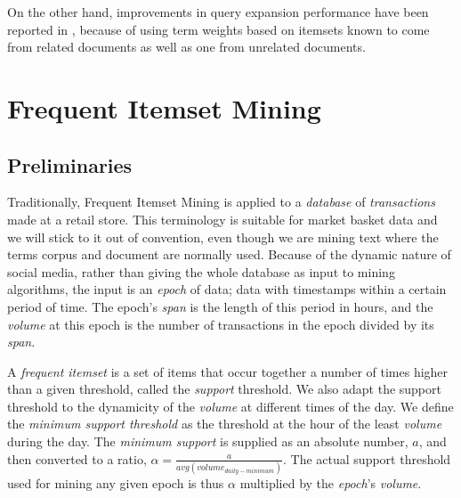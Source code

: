 \documentclass{sig-alternate}
\begin{document}
On the other hand, improvements in query expansion performance have been reported in \cite{li2010mining}, because of using  term weights based on itemsets known to come from related documents as well as one from unrelated documents. 



\section{Frequent Itemset Mining}
\label{sec:fim}
\subsection{Preliminaries}
Traditionally, Frequent Itemset Mining is applied to a \emph{database} of \emph{transactions} made at a retail store. This terminology is suitable for market basket data and we will stick to it out of convention, even though we are mining text where the terms corpus and document are normally used. Because of the dynamic nature of social media, rather than giving the whole database as input to mining algorithms, the input is an \emph{epoch} of data; data with timestamps within a certain period of time. The epoch's \emph{span} is the length of this period in hours, and the \emph{volume} at this epoch is the number of transactions in the epoch divided by its \emph{span}.

A \emph{frequent itemset} is a set of items that occur together a number of times higher than a given threshold, called the \emph{support} threshold. We also adapt the support threshold to the dynamicity of the \emph{volume} at different times of the day. We define the \emph{minimum support threshold} as the threshold at the hour of the least \emph{volume} during the day.  The \emph{minimum support} is supplied as an absolute number, $a$, and then converted to a ratio, $\alpha = \frac{a}{avg(volume_{daily-minimum})}$.
The actual support threshold used for mining any given epoch is thus $\alpha$ multiplied by the \emph{epoch}'s \emph{volume}. 
\end{document}

